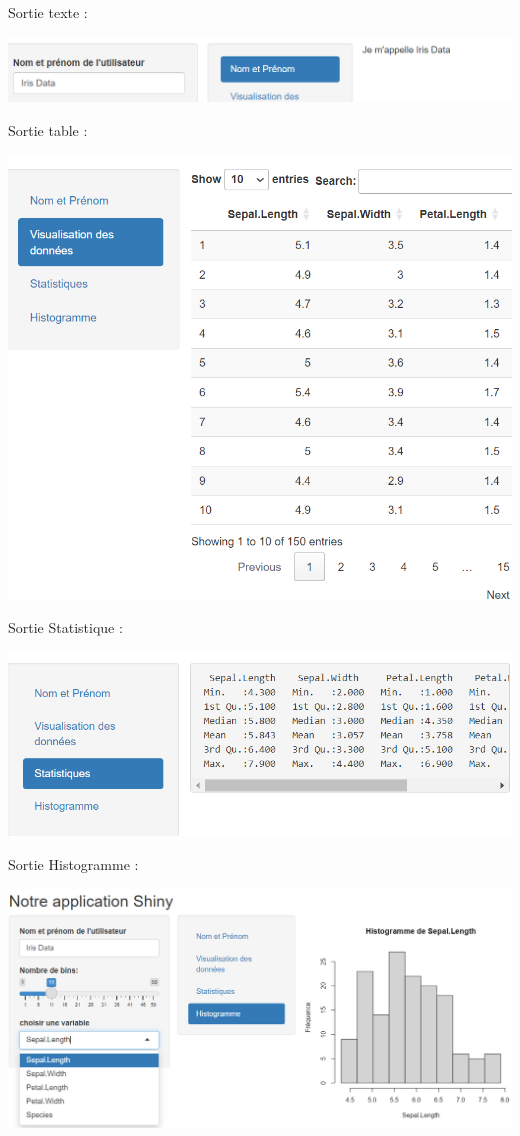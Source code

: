 \documentclass[
]{article}
\begin{document}
Sortie texte :

\includegraphics{images/clipboard-970673341.png}

Sortie table :

\includegraphics{images/clipboard-3180338201.png}

Sortie Statistique :

\includegraphics{images/clipboard-2535548311.png}

Sortie Histogramme :

\includegraphics{images/clipboard-927707726.png}
\end{document}
